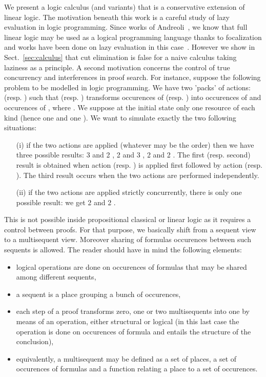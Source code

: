 \documentclass{llncs}
\begin{document}
We present a logic calculus (and variants) that is a conservative extension of linear logic. 
The motivation beneath this work is a careful study of lazy evaluation in logic programming. Since works of Andreoli~\cite{Andreoli92}, we know that full linear logic may be used as a logical programming language thanks to focalization and works have been done on lazy evaluation in this case~\cite{DBLP:conf/elp/CervesatoHP96}. However we show in Sect.~\ref{sec:calculus} that cut elimination is false for a naive calculus taking laziness as a principle. A second motivation concerns the control of true concurrency and interferences in proof search. For instance, suppose the following problem to be modelled in logic programming. We have two 'packs' of actions:  (resp. ) such that  (resp. ) transforms  occurences of  (resp. ) into  occurences of  and  occurences of , where . We suppose at the initial state only one resource
of each kind (hence one  and one ).
We want to simulate exactly the two following situations: 
\begin{itemize}
\item[(i)] if the two actions are applied (whatever may be the order) then we have three possible results:
3  and 2 , 2  and 3 , 2  and 2 . The first (resp. second) result is obtained when action  (resp. ) is applied first followed by action  (resp. ). The third result occurs when the two actions are performed independently.
\item[(ii)] if the two actions are applied strictly concurrently, there is only one possible result: we get 2  and 2 .
\end{itemize}
This is not possible inside propositional classical or linear logic as it requires a control between proofs.
For that purpose, we basically shift from a sequent view to a multisequent view. Moreover sharing of formulas occurences between such sequents is allowed. The reader should have in mind the following elements:
\begin{itemize}
\item logical operations are done on occurences of formulas that may be shared among different sequents,
\item a sequent is a place grouping a bunch of occurences,
\item each step of a proof transforms zero, one or two multisequents into one by means of an operation, either structural or logical (in this last case the operation is done on occurences of formula and entails the structure of the conclusion),
\item equivalently, a multisequent may be defined as a set of places, a set of occurences of formulas and a function relating a place to a set of occurences.
\end{itemize}
\end{document}
